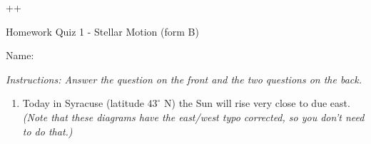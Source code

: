 ++\documentclass[12pt]{article}
\begin{document}
\begin{center}
	\Large \sc Homework Quiz 1 - Stellar Motion (form B)
\end{center}

\begin{flushright}
	Name: \underline{\hspace{4in}}
\end{flushright}

\it Instructions: Answer the question on the front and the two questions on the back. 

\rm
	
	\begin{enumerate}
		\item Today in Syracuse (latitude $43^\circ$ N) the Sun will rise very close to due east. {\it (Note that these diagrams have the east/west typo corrected, so you don't need to do that.)} 
		

\end{enumerate}
\end{document}

